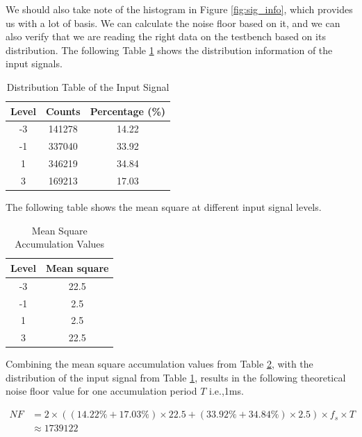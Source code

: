 We should also take note of the histogram in Figure \ref{fig:sig_info}, which provides us with a lot of basis. We can calculate the noise floor based on it, and we can also verify that we are reading the right data on the testbench based on its distribution. The following Table \ref{tab:dis_sig} shows the distribution information of the input signals.

\begin{table}[!htbp]
\centering
\renewcommand\arraystretch{1.5}
\caption{Distribution Table of the Input Signal}
\label{tab:dis_sig}
\begin{tabular}{ccc}
    \toprule
    Level & Counts & Percentage (\%) \\
    \midrule
    -3 & \num{141278} & 14.22 \\
    -1 & \num{337040} & 33.92 \\
    1 & \num{346219} & 34.84 \\
    3 & \num{169213} & 17.03 \\
    \bottomrule
\end{tabular}
\end{table}

The following table shows the mean square at different input signal levels.
\begin{table}[!htbp]
    \centering
    \renewcommand\arraystretch{1.5}
    \caption{Mean Square Accumulation Values}
    \label{tab:mean_square}
    \begin{tabular}{cc}
        \toprule
        Level & Mean square \\
        \midrule
        -3 & 22.5 \\
        -1 & 2.5 \\
        1 & 2.5 \\
        3 & 22.5 \\
        \bottomrule
    \end{tabular}
\end{table}

Combining the mean square accumulation values from Table \ref{tab:mean_square}, with the distribution of the input signal from Table \ref{tab:dis_sig}, results in the following theoretical noise floor value for one accumulation period $T$ i.e.,1ms.

\begin{equation}
\begin{aligned}
    {NF} &= 2\times ((14.22\%+17.03\%) \times 22.5 + (33.92\%+34.84\%) \times 2.5)\times f_s \times T \\
    &\approx \num{1739122}
\end{aligned}
\end{equation}

